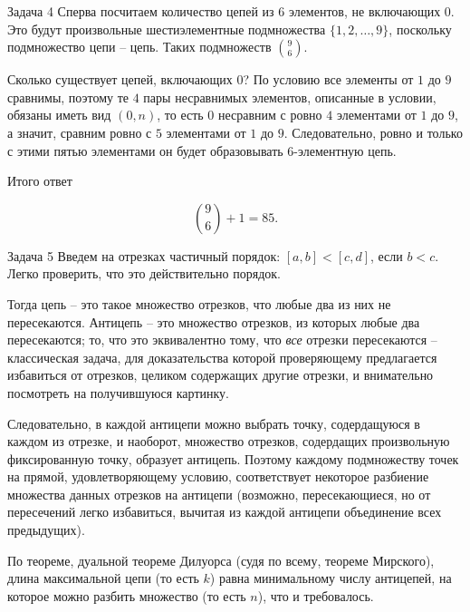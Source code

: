 \documentclass{article}
\begin{document}
	\begin{section}{Задача 4}
		Сперва посчитаем количество цепей из $6$ элементов, не включающих $0$. Это будут произвольные шестиэлементные подмножества $\{1, 2, \dots, 9\}$, поскольку подмножество цепи -- цепь. Таких подмножеств $\binom{9}{6}$.

		Сколько существует цепей, включающих $0$? По условию все элементы от $1$ до $9$ сравнимы, поэтому те $4$ пары несравнимых элементов, описанные в условии, обязаны иметь вид $(0, n)$, то есть $0$ несравним с ровно $4$ элементами от $1$ до $9$, а значит, сравним ровно с $5$ элементами от $1$ до $9$. Следовательно, ровно и только с этими пятью элементами он будет образовывать $6$-элементную цепь.

		Итого ответ

		\begin{equation*}
			\binom{9}{6} + 1 = 85.
		\end{equation*}
	\end{section}

	\begin{section}{Задача 5}
		Введем на отрезках частичный порядок: $[a, b] < [c, d]$, если $b < c$. Легко проверить, что это действительно порядок.

		Тогда цепь -- это такое множество отрезков, что любые два из них не пересекаются. Антицепь -- это множество отрезков, из которых любые два пересекаются; то, что это эквивалентно тому, что \textit{все} отрезки пересекаются -- классическая задача, для доказательства которой проверяющему предлагается избавиться от отрезков, целиком содержащих другие отрезки, и внимательно посмотреть на получившуюся картинку.

		Следовательно, в каждой антицепи можно выбрать точку, содердащуюся в каждом из отрезке, и наоборот, множество отрезков, содердащих произвольную фиксированную точку, образует антицепь. Поэтому каждому подмножеству точек на прямой, удовлетворяющему условию, соответствует некоторое разбиение множества данных отрезков на антицепи (возможно, пересекающиеся, но от пересечений легко избавиться, вычитая из каждой антицепи объединение всех предыдущих).

		По теореме, дуальной теореме Дилуорса (судя по всему, теореме Мирского), длина максимальной цепи (то есть $k$) равна минимальному числу антицепей, на которое можно разбить множество (то есть $n$), что и требовалось.
	\end{section}
\end{document}
